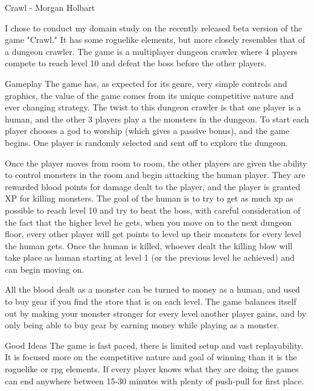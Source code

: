 \documentclass[12pt]{report}
\begin{document}
\begin{section}{Crawl - Morgan Holbart}

I chose to conduct my domain study on the recently released beta version of the game "Crawl." It has some roguelike 
elements, but more closely resembles that of a dungeon crawler. The game is a multiplayer dungeon crawler where 4 
players compete to reach level 10 and defeat the boss before the other players. 

\begin{subsection}{Gameplay}
The game has, as expected for its genre, very simple controls and graphics, the value of the game comes from 
its unique competitive nature and ever changing strategy. The twist to this dungeon crawler is that one player
is a human, and the other 3 players play a the monsters in the dungeon. To start each player chooses a god to 
worship (which gives a passive bonus), and the game begins. One player is randomly selected and sent off to 
explore the dungeon.

Once the player moves from room to room, the other players are given the ability to control monsters in the room
and begin attacking the human player. They are rewarded blood points for damage dealt to the player, and the player
is granted XP for killing monsters. The goal of the human is to try to get as much xp as possible to reach level 10
and try to beat the boss, with careful consideration of the fact that the higher level he gets, when you move on to 
the next dungeon floor, every other player will get points to level up their monsters for every level the human gets.
Once the human is killed, whoever dealt the killing blow will take place as human starting at level 1 (or the previous
level he achieved) and can begin moving on.

All the blood dealt as a monster can be turned to money as a human, and used to buy gear if you find the store that is
on each level. The game balances itself out by making your monster stronger for every level another player gains,
and by only being able to buy gear by earning money while playing as a monster.
\end{subsection}

\begin{subsection}{Good Ideas}
The game is fast paced, there is limited setup and vast replayability. It is focused more on the competitive nature
and goal of winning than it is the roguelike or rpg elements. If every player knows what they are doing the games
can end anywhere between 15-30 minutes with plenty of push-pull for first place.


\end{subsection}
\end{section}
\end{document}
